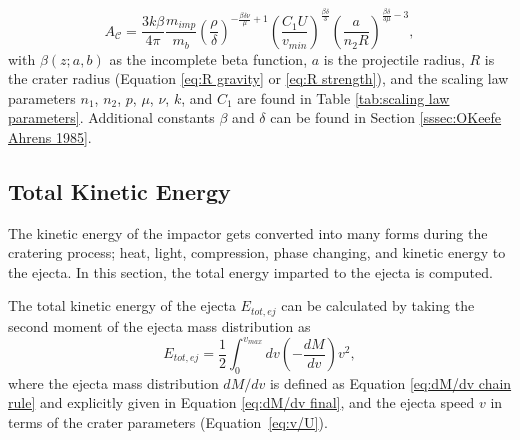 \documentclass{article}
\begin{document}
\begin{equation}
A_\mathcal{C} = \frac{3k\beta}{4\pi}\frac{m_{imp}}{m_b}
\left(\frac{\rho}{\delta}\right)^{-\frac{\beta\delta\nu}{\mu}+1}
\left(\frac{C_1 U}{v_{min}}\right)^{\frac{\beta\delta}{3}}
\left(\frac{a}{n_2 R}\right)^{\frac{\beta\delta}{3\mu}-3},
\end{equation}
with $\beta(z; a, b)$ as the incomplete beta function, $a$ is the projectile radius, $R$ is the crater radius (Equation \eqref{eq:R gravity} or \eqref{eq:R strength}), and the scaling law parameters $n_1$, $n_2$, $p$, $\mu$, $\nu$, $k$, and $C_1$ are found in Table \ref{tab:scaling law parameters}. Additional constants $\beta$ and $\delta$ can be found in Section \ref{sssec:OKeefe Ahrens 1985}.




\subsection{Total Kinetic Energy}\label{ssec:Total Kinetic Energy}

The kinetic energy of the impactor gets converted into many forms during the cratering process; heat, light, compression, phase changing, and kinetic energy to the ejecta. In this section, the total energy imparted to the ejecta is computed.

The total kinetic energy of the ejecta $E_{tot,ej}$ can be calculated by taking the second moment of the ejecta mass distribution as
\begin{equation}
E_{tot,ej} = \frac{1}{2}\int_{0}^{v_{max}}dv \left(-\frac{dM}{dv}\right)v^2,
\end{equation}
where the ejecta mass distribution $dM/dv$ is defined as Equation \eqref{eq:dM/dv chain rule} and explicitly given in Equation \eqref{eq:dM/dv final}, and the ejecta speed $v$ in terms of the crater parameters (Equation~\eqref{eq:v/U}).
\end{document}
